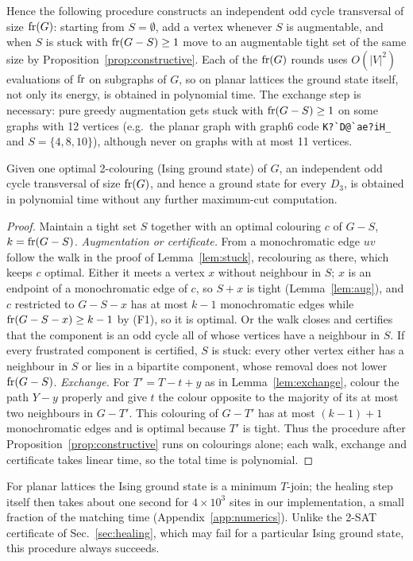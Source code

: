 Hence the following procedure constructs an independent odd cycle transversal of size $\operatorname{fr}(G)$:
starting from $S=\emptyset$, add a vertex whenever $S$ is augmentable, and when $S$ is stuck with
$\operatorname{fr}(G-S)\ge1$ move to an augmentable tight set of the same size by
Proposition~\ref{prop:constructive}. Each of the $\operatorname{fr}(G)$ rounds uses $O(|V|^2)$ evaluations of
$\operatorname{fr}$ on subgraphs of $G$, so on planar lattices the ground state itself, not only its energy, is
obtained in polynomial time. The exchange step is necessary: pure greedy augmentation gets stuck
with $\operatorname{fr}(G-S)\ge1$ on some graphs with 12 vertices (e.g.\ the planar graph with graph6 code
\verb+K?`D@`ae?iH_+ and $S=\{4,8,10\}$), although never on graphs with at most 11 vertices.

\begin{corollary}\label{cor:one-ground-state}
Given one optimal 2-colouring (Ising ground state) of $G$, an independent odd cycle transversal of
size $\operatorname{fr}(G)$, and hence a ground state for every $D_3$, is obtained in polynomial time without
any further maximum-cut computation.
\end{corollary}
\begin{proof}
Maintain a tight set $S$ together with an optimal colouring $c$ of $G-S$, $k=\operatorname{fr}(G-S)$.
\emph{Augmentation or certificate.} From a monochromatic edge $uv$ follow the walk in the proof of
Lemma~\ref{lem:stuck}, recolouring as there, which keeps $c$ optimal. Either it meets a vertex $x$
without neighbour in $S$; $x$ is an endpoint of a monochromatic edge of $c$, so $S+x$ is tight
(Lemma~\ref{lem:aug}), and $c$ restricted to $G-S-x$ has at most $k-1$ monochromatic edges while
$\operatorname{fr}(G-S-x)\ge k-1$ by (F1), so it is optimal. Or the walk closes and certifies that the component
is an odd cycle all of whose vertices have a neighbour in $S$. If every frustrated component is
certified, $S$ is stuck: every other vertex either has a neighbour in $S$ or lies in a bipartite
component, whose removal does not lower $\operatorname{fr}(G-S)$.
\emph{Exchange.} For $T'=T-t+y$ as in Lemma~\ref{lem:exchange}, colour the path $Y-y$ properly and
give $t$ the colour opposite to the majority of its at most two neighbours in $G-T'$. This colouring
of $G-T'$ has at most $(k-1)+1$ monochromatic edges and is optimal because $T'$ is tight.
Thus the procedure after Proposition~\ref{prop:constructive} runs on colourings alone; each walk,
exchange and certificate takes linear time, so the total time is polynomial.
\end{proof}

For planar lattices the Ising ground state is a minimum $T$-join; the healing step itself then
takes about one second for $4\times10^3$ sites in our implementation, a small fraction of the
matching time (Appendix~\ref{app:numerics}). Unlike the 2-SAT certificate of Sec.~\ref{sec:healing}, which may fail for a particular Ising
ground state, this procedure always succeeds.


